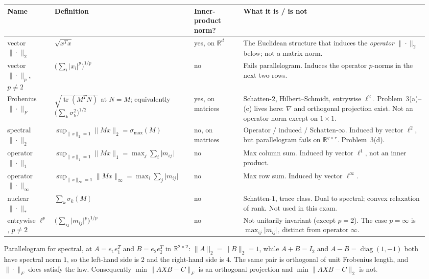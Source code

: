 \documentclass[11pt,a4paper]{article}
\begin{document}
\begin{remark}
{\footnotesize
\begin{center}
\begin{tabular}{@{}>{\raggedright\arraybackslash}p{2.55cm}
                   >{\raggedright\arraybackslash}p{3.55cm}
                   >{\centering\arraybackslash}p{1.85cm}
                   >{\raggedright\arraybackslash}p{5.35cm}@{}}
\toprule
Name & Definition & Inner-product norm? & What it is / is not \\
\midrule
vector \(\|\cdot\|_{2}\)
&
\(\sqrt{x^{T}x}\)
&
yes, on \(\mathbb{R}^{d}\)
&
The Euclidean structure that induces the \emph{operator} \(\|\cdot\|_{2}\) below; not a matrix norm.
\\[0.35em]
vector \(\|\cdot\|_{p}\), \(p\neq 2\)
&
\(\bigl(\sum_{i}\lvert x_{i}\rvert^{p}\bigr)^{1/p}\)
&
no
&
Fails parallelogram. Induces the operator \(p\)-norms in the next two rows.
\\[0.35em]
Frobenius \(\|\cdot\|_{F}\)
&
\(\sqrt{\operatorname{tr}(M^{T}N)}\) at \(N=M\); equivalently \(\bigl(\sum_{k}\sigma_{k}^{2}\bigr)^{1/2}\)
&
yes, on matrices
&
Schatten-\(2\), Hilbert--Schmidt, entrywise \(\ell^{2}\). Problem~3(a)--(c) lives here: \(\nabla\) and orthogonal projection exist. Not an operator norm except on \(1\times 1\).
\\[0.35em]
spectral \(\|\cdot\|_{2}\)
&
\(\sup_{\|x\|_{2}=1}\|Mx\|_{2}=\sigma_{\max}(M)\)
&
no, on matrices
&
Operator / induced / Schatten-\(\infty\). Induced by vector \(\ell^{2}\), but parallelogram fails on \(\mathbb{R}^{q\times r}\). Problem~3(d).
\\[0.35em]
operator \(\|\cdot\|_{1}\)
&
\(\sup_{\|x\|_{1}=1}\|Mx\|_{1}=\max_{j}\sum_{i}\lvert m_{ij}\rvert\)
&
no
&
Max column sum. Induced by vector \(\ell^{1}\), not an inner product.
\\[0.35em]
operator \(\|\cdot\|_{\infty}\)
&
\(\sup_{\|x\|_{\infty}=1}\|Mx\|_{\infty}=\max_{i}\sum_{j}\lvert m_{ij}\rvert\)
&
no
&
Max row sum. Induced by vector \(\ell^{\infty}\).
\\[0.35em]
nuclear \(\|\cdot\|_{*}\)
&
\(\sum_{k}\sigma_{k}(M)\)
&
no
&
Schatten-\(1\), trace class. Dual to spectral; convex relaxation of rank. Not used in this exam.
\\[0.35em]
entrywise \(\ell^{p}\), \(p\neq 2\)
&
\(\bigl(\sum_{ij}\lvert m_{ij}\rvert^{p}\bigr)^{1/p}\)
&
no
&
Not unitarily invariant (except \(p=2\)). The case \(p=\infty\) is \(\max_{ij}\lvert m_{ij}\rvert\), distinct from operator \(\infty\).
\\
\bottomrule
\end{tabular}
\end{center}
}

Parallelogram for spectral, at \(A=e_{1}e_{1}^{T}\) and \(B=e_{2}e_{2}^{T}\) in \(\mathbb{R}^{2\times 2}\): \(\|A\|_{2}=\|B\|_{2}=1\), while \(A+B=I_{2}\) and \(A-B=\operatorname{diag}(1,-1)\) both have spectral norm \(1\), so the left-hand side is \(2\) and the right-hand side is \(4\). The same pair is orthogonal of unit Frobenius length, and \(\|\cdot\|_{F}\) does satisfy the law. Consequently \(\min\|AXB-C\|_{F}\) is an orthogonal projection and \(\min\|AXB-C\|_{2}\) is not.
\end{remark}
\end{document}
